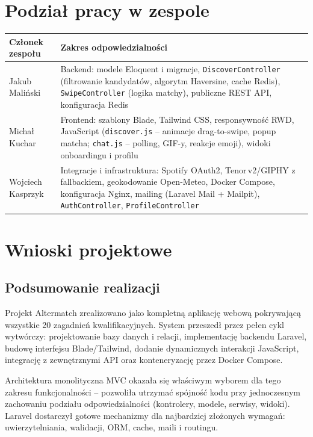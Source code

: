 \documentclass[12pt,a4paper]{article}
\newcommand{\autorA}{Jakub Maliński}
\newcommand{\autorB}{Michał Kuchar}
\newcommand{\autorC}{Wojciech Kasprzyk}
\begin{document}
\section{Podział pracy w zespole}

\begin{longtable}{|p{4.5cm}|p{8.7cm}|}
\hline
\textbf{Członek zespołu} & \textbf{Zakres odpowiedzialności} \\
\hline
\autorA & Backend: modele Eloquent i migracje, \texttt{DiscoverController} (filtrowanie kandydatów, algorytm Haversine, cache Redis), \texttt{SwipeController} (logika matchy), publiczne REST API, konfiguracja Redis \\
\hline
\autorB & Frontend: szablony Blade, Tailwind CSS, responsywność RWD, JavaScript (\texttt{discover.js} -- animacje drag-to-swipe, popup matcha; \texttt{chat.js} -- polling, GIF-y, reakcje emoji), widoki onboardingu i profilu \\
\hline
\autorC & Integracje i infrastruktura: Spotify OAuth2, Tenor\,v2/GIPHY z fallbackiem, geokodowanie Open-Meteo, Docker Compose, konfiguracja Nginx, mailing (Laravel Mail + Mailpit), \texttt{AuthController}, \texttt{ProfileController} \\
\hline
\end{longtable}

\section{Wnioski projektowe}

\subsection{Podsumowanie realizacji}

Projekt Altermatch zrealizowano jako kompletną aplikację webową pokrywającą wszystkie 20 zagadnień kwalifikacyjnych. System przeszedł przez pełen cykl wytwórczy: projektowanie bazy danych i relacji, implementację backendu Laravel, budowę interfejsu Blade/Tailwind, dodanie dynamicznych interakcji JavaScript, integrację z zewnętrznymi API oraz konteneryzację przez Docker Compose.

Architektura monolityczna MVC okazała się właściwym wyborem dla tego zakresu funkcjonalności -- pozwoliła utrzymać spójność kodu przy jednoczesnym zachowaniu podziału odpowiedzialności (kontrolery, modele, serwisy, widoki). Laravel dostarczył gotowe mechanizmy dla najbardziej złożonych wymagań: uwierzytelniania, walidacji, ORM, cache, maili i routingu.
\end{document}

